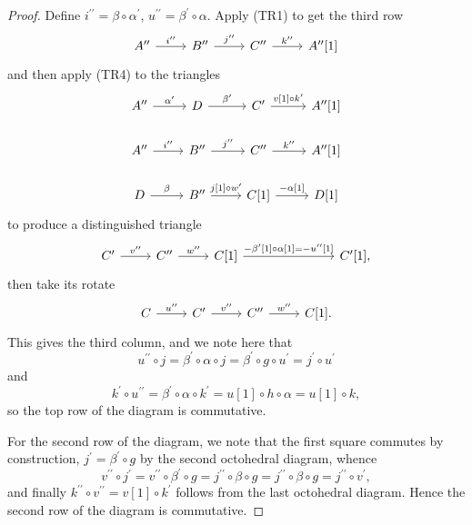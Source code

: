 \documentclass[dissertation.tex]{subfiles}
\begin{document}
\begin{prop}
\begin{proof}
    Define $i^{\prime\prime} = \beta \circ \alpha^\prime$, $u^{\prime\prime} = \beta^\prime \circ \alpha$.
    Apply (TR1) to get the third row
    $$\begin{tikzcd}
      A^{\prime\prime} \arrow{r}{i^{\prime\prime}} & B^{\prime\prime} \arrow{r}{j^{\prime\prime}} & C^{\prime\prime} \arrow{r}{k^{\prime\prime}} & A^{\prime\prime}[1]
    \end{tikzcd}$$
    and then apply (TR4) to the triangles
    $$\begin{tikzcd}
      A^{\prime\prime} \arrow{r}{\alpha^\prime} & D \arrow{r}{\beta^\prime} & C^\prime \arrow{r}{v[1] \circ k^\prime} & A^{\prime\prime}[1]\\
      A^{\prime\prime} \arrow{r}{i^{\prime\prime}} & B^{\prime\prime} \arrow{r}{j^{\prime\prime}} & C^{\prime\prime} \arrow{r}{k^{\prime\prime}} & A^{\prime\prime}[1]\\
      D \arrow{r}{\beta} & B^{\prime\prime} \arrow{r}{j[1] \circ w^\prime} & C[1] \arrow{r}{-\alpha[1]} & D[1]
    \end{tikzcd}$$
    to produce a distinguished triangle
    $$\begin{tikzcd}
      C^\prime \arrow{r}{v^{\prime\prime}} & C^{\prime\prime} \arrow{r}{w^{\prime\prime}} & C[1] \arrow{rrr}{-\beta^\prime[1] \circ \alpha[1] = -u^{\prime\prime}[1]} & & & C^\prime[1],
    \end{tikzcd}$$
    then take its rotate
    $$\begin{tikzcd}
      C \arrow{r}{u^{\prime\prime}} & C^\prime \arrow{r}{v^{\prime\prime}} & C^{\prime\prime} \arrow{r}{w^{\prime\prime}} & C[1].
    \end{tikzcd}$$
    This gives the third column, and we note here that
    $$u^{\prime\prime} \circ j = \beta^\prime \circ \alpha \circ j = \beta^\prime \circ g \circ u^\prime = j^\prime \circ u^\prime$$
    and 
    $$k^\prime \circ u^{\prime\prime} = \beta^\prime \circ \alpha \circ k^\prime = u[1] \circ h \circ \alpha = u[1] \circ k,$$
    so the top row of the diagram is commutative.
    
    For the second row of the diagram, we note that the first square commutes by construction,
    $j^\prime = \beta^\prime \circ g$ by the second octohedral diagram, whence
    $$v^{\prime\prime} \circ j^\prime = v^{\prime\prime} \circ \beta^\prime \circ g = j^{\prime\prime} \circ \beta \circ g = j^{\prime\prime} \circ \beta \circ g = j^{\prime\prime} \circ v^\prime,$$
    and finally $k^{\prime\prime} \circ v^{\prime\prime} = v[1] \circ k^\prime$ follows from the last octohedral diagram.
    Hence the second row of the diagram is commutative.
    

\end{proof}
\end{prop}
\end{document}
